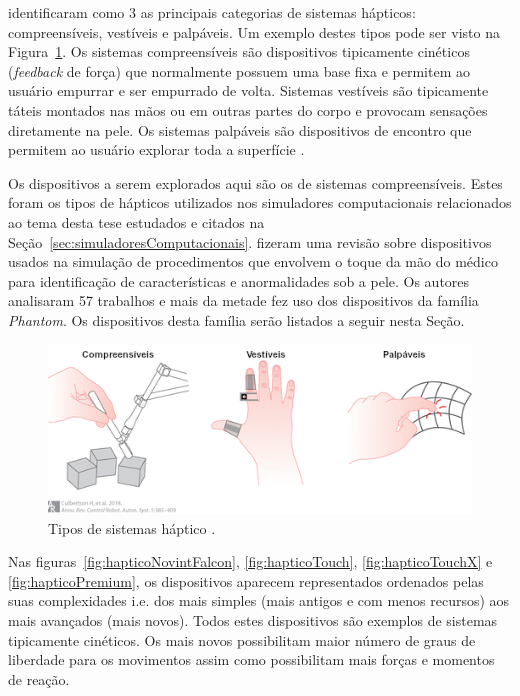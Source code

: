 \textcite{Culbertson2018} identificaram como 3 as principais categorias de sistemas hápticos: compreensíveis, vestíveis e palpáveis. Um exemplo  destes tipos pode ser visto na Figura~\ref{fig:tiposHapticos}. Os sistemas compreensíveis são dispositivos tipicamente cinéticos (\textit{feedback} de força) que normalmente possuem uma base fixa e permitem ao usuário empurrar e ser empurrado de volta. Sistemas vestíveis são tipicamente táteis montados nas mãos ou em outras partes do corpo e provocam sensações diretamente na pele. Os sistemas palpáveis são dispositivos de encontro que permitem ao usuário explorar toda a superfície \cite{Culbertson2018}. 

Os dispositivos a serem explorados aqui são os de sistemas compreensíveis. Estes foram os tipos de hápticos utilizados nos simuladores computacionais relacionados ao tema desta tese estudados e citados na Seção~\ref{sec:simuladoresComputacionais}. \textcite{Ribeiro2016} fizeram uma revisão sobre dispositivos usados na simulação de procedimentos que envolvem o toque da mão do médico para identificação de características e anormalidades sob a pele. Os autores analisaram 57 trabalhos e mais da metade fez uso dos dispositivos da família \textit{Phantom}. Os dispositivos desta família serão listados a seguir nesta Seção.

\begin{figure}[ht!]
    \centering
    \includegraphics[width=0.8\linewidth]{capitulos/figuras/tipos.hapticos-portugues.png}
    \caption{Tipos de sistemas háptico \cite{Culbertson2018}.}
    \label{fig:tiposHapticos}
\end{figure}

Nas figuras~\ref{fig:hapticoNovintFalcon}, \ref{fig:hapticoTouch}, \ref{fig:hapticoTouchX} e  \ref{fig:hapticoPremium}, os dispositivos aparecem representados ordenados pelas suas complexidades i.e. dos mais simples (mais antigos e com menos recursos) aos mais avançados (mais novos). Todos estes dispositivos são exemplos de sistemas tipicamente cinéticos. Os mais novos possibilitam maior número de graus de liberdade para os movimentos assim como possibilitam mais forças e momentos de reação. 

